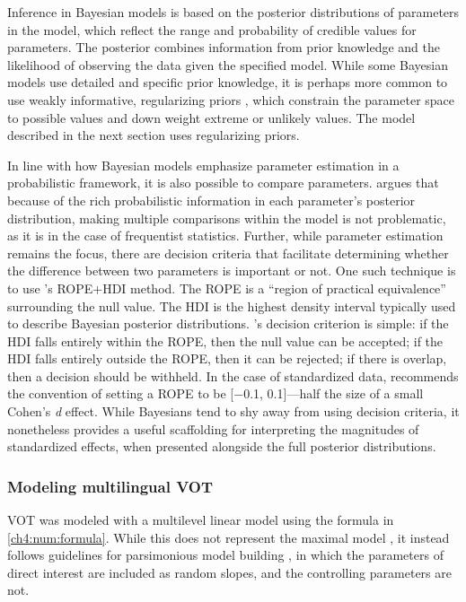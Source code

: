 Inference in Bayesian models is based on the posterior distributions of parameters in the model, which reflect the range and probability of credible values for parameters. The posterior combines information from prior knowledge and the likelihood of observing the data given the specified model. While some Bayesian models use detailed and specific prior knowledge, it is perhaps more common to use weakly informative, regularizing priors \citep{gelman_2017_prior}, which constrain the parameter space to possible values and down weight extreme or unlikely values. The model described in the next section uses regularizing priors. 

In line with how Bayesian models emphasize parameter estimation in a probabilistic framework, it is also possible to compare parameters. \citet{gelman_2012_multiple} argues that because of the rich probabilistic information in each parameter's posterior distribution, making multiple comparisons within the model is not problematic, as it is in the case of frequentist statistics. Further, while parameter estimation remains the focus, there are decision criteria that facilitate determining whether the difference between two parameters is important or not. One such technique is to use \citeauthor{kruschke_2011_rope}'s \citeyearpar{kruschke_2011_rope} ROPE+HDI method. The ROPE is a ``region of practical equivalence'' surrounding the null value. The HDI is the highest density interval typically used to describe Bayesian posterior distributions. \citeauthor{kruschke_2011_rope}'s \citeyearpar{kruschke_2011_rope} decision criterion is simple: if the HDI falls entirely within the ROPE, then the null value can be accepted; if the HDI falls entirely outside the ROPE, then it can be rejected; if there is overlap, then a decision should be withheld. In the case of standardized data, \citet{kruschke_2011_rope} recommends the convention of setting a ROPE to be [$-$0.1, 0.1]---half the size of a small Cohen's \textit{d} effect. While Bayesians tend to shy away from using decision criteria, it nonetheless provides a useful scaffolding for interpreting the magnitudes of standardized effects, when presented alongside the full posterior distributions. 

\subsubsection{Modeling multilingual VOT}\label{ch4:sec:model}

VOT was modeled with a multilevel linear model using the formula in \ref{ch4:num:formula}. While this does not represent the maximal model \citep{barr_2013_maximal}, it instead follows guidelines for parsimonious model building \citep{bates_2018_parsimonious}, in which the parameters of direct interest are included as random slopes, and the controlling parameters are not.

